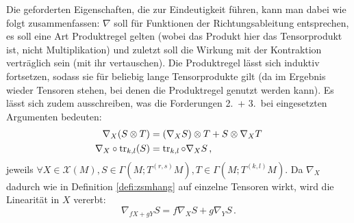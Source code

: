 Die geforderten Eigenschaften, die zur Eindeutigkeit führen, kann man dabei wie folgt zusammenfassen: $\nabla$ soll für Funktionen der Richtungsableitung entsprechen, es soll eine Art Produktregel gelten (wobei das Produkt hier das Tensorprodukt ist, nicht Multiplikation) und zuletzt soll die Wirkung mit der Kontraktion verträglich sein (mit ihr vertauschen). Die Produktregel lässt sich induktiv fortsetzen, sodass sie für beliebig lange Tensorprodukte gilt (da im Ergebnis wieder Tensoren stehen, bei denen die Produktregel genutzt werden kann). Es lässt sich zudem ausschreiben, was die Forderungen 2.~+ 3.~bei eingesetzten Argumenten bedeuten:
\begin{align*}
\nabla_X(S \otimes T) &= (\nabla_X S) \otimes T + S \otimes \nabla_X T 
\\
\nabla_X \circ \tr_{k, l}(S) &= \tr_{k, l} \circ \nabla_X S \, ,
\end{align*}
jeweils $\forall X \in \mathcal{X}(M), S \in \Gamma(M; T^{(r, s)}M), T \in \Gamma(M; T^{(k, l)}M)$. Da $\nabla_X$ dadurch wie in Definition \ref{defi:zsmhang} auf einzelne Tensoren wirkt, wird die Linearität in $X$ vererbt:
\begin{equation}
\nabla_{f X + g Y} S = f \nabla_X S + g \nabla_Y S \, .
\end{equation}


